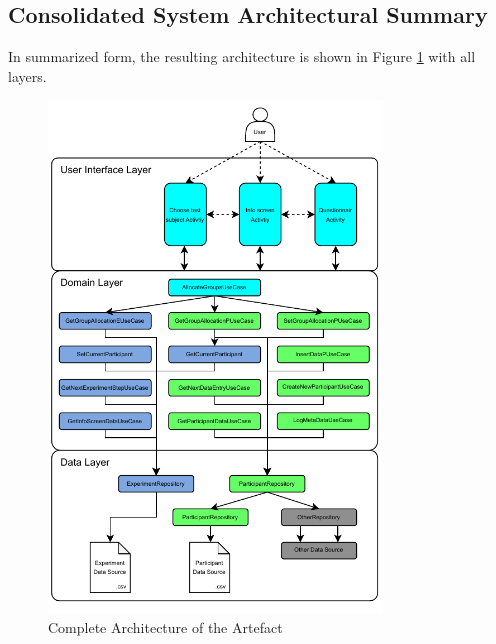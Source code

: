 \subsection{Consolidated System Architectural Summary}\label{subsec:completeArchitecture}

In summarized form, the resulting architecture is shown in Figure \ref{fig:completeArchitecture} with all layers.

\begin{figure}[htbp]
    \centering
    \includegraphics[width=0.79\textwidth, keepaspectratio]{content/05_design_and_dev_artefacts/Complete Architecture.drawio.pdf}
    \caption{Complete Architecture of the Artefact}    
    \label{fig:completeArchitecture}
\end{figure}


